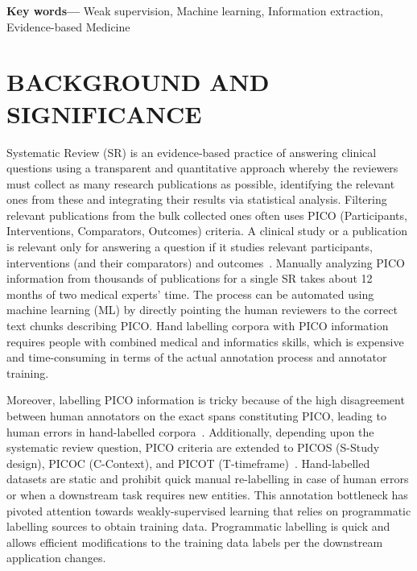 \documentclass[10.7pt,]{article}
\providecommand{\keywords}[1]
{
  \small	
  \textbf{Key words---} #1
}
\begin{document}
\keywords{Weak supervision, Machine learning, Information extraction, Evidence-based Medicine}
%
\clearpage
%
%
%
\section{BACKGROUND AND SIGNIFICANCE}\label{introduction}
%
Systematic Review (SR) is an evidence-based practice of answering clinical questions using a transparent and quantitative approach whereby the reviewers must collect as many research publications as possible, identifying the relevant ones from these and integrating their results via statistical analysis.
Filtering relevant publications from the bulk collected ones often uses PICO (Participants, Interventions, Comparators, Outcomes) criteria. 
A clinical study or a publication is relevant only for answering a question if it studies relevant participants, interventions (and their comparators) and outcomes~\cite{uman2011systematic}. 
Manually analyzing PICO information from thousands of publications for a single SR takes about 12 months of two medical experts' time.
The process can be automated using machine learning (ML) by directly pointing the human reviewers to the correct text chunks describing PICO.
Hand labelling corpora with PICO information requires people with combined medical and informatics skills, which is expensive and time-consuming in terms of the actual annotation process and annotator training.


Moreover, labelling PICO information is tricky because of the high disagreement between human annotators on the exact spans constituting PICO, leading to human errors in hand-labelled corpora~\cite{brockmeier2019improving}.
Additionally, depending upon the systematic review question, PICO criteria are extended to PICOS (S-Study design), PICOC (C-Context), and PICOT (T-timeframe)~\cite{riva2012your,methley2014pico,uman2011systematic}.
Hand-labelled datasets are static and prohibit quick manual re-labelling in case of human errors or when a downstream task requires new entities.
This annotation bottleneck has pivoted attention towards weakly-supervised learning that relies on programmatic labelling sources to obtain training data.
Programmatic labelling is quick and allows efficient modifications to the training data labels per the downstream application changes.
\end{document}
